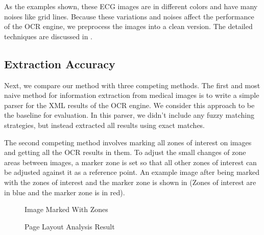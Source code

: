 As the examples shown, these ECG images are in different colors 
and have many noises like grid lines. 
Because these variations and noises affect the performance of the OCR engine, 
we preprocess the images into a clean version. 
The detailed techniques are discussed in . 


\subsection{Extraction Accuracy}
Next, we compare our method with three competing methods.
The first and most naive method for information extraction from medical images 
is to write a simple parser for the XML results of the OCR engine. 
We consider this approach to be the baseline for 
evaluation. In this parser, we didn't include any fuzzy matching 
strategies, but instead extracted all results using exact matches. 

The second competing method involves marking all zones of interest 
on images and getting all the OCR results in them. 
To adjust the small changes of 
zone areas between images, a marker zone is set so that 
all other zones of interest can be adjusted against it as
a reference point. 
An example image after being marked with the zones of interest 
and the marker zone is shown in  (Zones of interest 
are in blue and the marker zone is in red).

\begin{figure}[th]
\centering
{}
\caption{Image Marked With Zones}
\label{fig:zOCR}
\centering
{}
\caption{Page Layout Analysis Result}
\label{fig:pl}
\end{figure}


